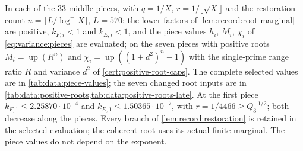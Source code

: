\begin{certificate}\label{cert:record:variance-linear}
In each of the $33$ middle pieces, with $q=1/X$, $r=1/\lfloor\sqrt X\rfloor$
and the restoration count $n=\lfloor L/\log^-X\rfloor$, $L=570$: the lower factors
of \cref{lem:record:root-marginal} are positive, $k_{F,i}<1$ and $k_{E,i}<1$, and
the piece values $h_i$, $M_i$, $\chi_i$ of \eqref{eq:variance:pieces} are
evaluated; on the seven pieces with positive roots
$M_i=\operatorname{up}(R^n)$ and $\chi_i=\operatorname{up}((1+d^2)^n-1)$ with the
single-prime range ratio $R$ and variance $d^2$ of
\cref{cert:positive-root-caps}. The complete selected values are in \cref{tab:data:piece-values}; the
seven changed root inputs are in \cref{tab:data:positive-roots,tab:data:positive-roots-late}.
At the first piece $k_{F,1}\le2.25870\cdot10^{-4}$ and
$k_{E,1}\le1.50365\cdot10^{-7}$, with $r=1/4466\ge Q_3^{-1/2}$; both decrease
along the pieces. Every branch of \cref{lem:record:restoration} is retained in the selected
evaluation; the coherent root uses its actual finite marginal. The piece values do not depend on
the exponent.
\end{certificate}

